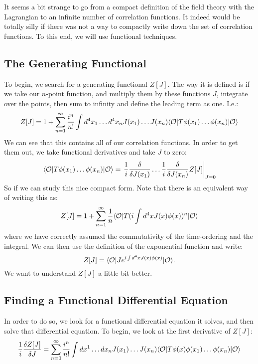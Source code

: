It seems a bit strange to go from a compact definition of the field theory with the Lagrangian to an infinite number of correlation functions. It indeed would be totally silly if there was not a way to compactly write down the set of correlation functions. To this end, we will use functional techniques.

\subsection{The Generating Functional}
To begin, we search for a generating functional $Z[J]$. The way it is defined is if we take our $n$-point function, and multiply them by these functions $J$, integrate over the points, then sum to infinity and define the leading term as one. I.e.:
\begin{equation}
    Z[J] = 1 + \sum_{n=1}^\infty \frac{i^n}{n!}\int d^4x_1 \ldots d^4x_n J(x_1)\ldots J(x_n)\bra{\O}T\phi(x_1) \ldots \phi(x_n)\ket{\O}
\end{equation}
We can see that this contains all of our correlation functions. In order to get them out, we take functional derivatives and take $J$ to zero:
\begin{equation}
    \bra{\O}T\phi(x_1) \ldots \phi(x_n)\ket{\O} = \left.\frac{1}{i}\frac{\delta}{\delta J(x_1)} \ldots \frac{1}{i}\frac{\delta}{\delta J(x_n)}Z[J]\right|_{J=0}
\end{equation}
So if we can study this nice compact form. Note that there is an equivalent way of writing this as:
\begin{equation}
    Z[J] = 1 + \sum_{n=1}^\infty \frac{1}{n}\bra{\O}T(i\int d^4x J(x)\phi(x))^n \ket{\O}
\end{equation}
where we have correctly assumed the commutativity of the time-ordering and the integral. We can then use the definition of the exponential function and write:
\begin{equation}
    Z[J] = \bra{\O}Je^{i\int d^4x J(x)\phi(x)}\ket{\O}.
\end{equation}
We want to understand $Z[J]$ a little bit better.

\subsection{Finding a Functional Differential Equation}
In order to do so, we look for a functional differential equation it solves, and then solve that differential equation. To begin, we look at the first derivative of $Z[J]$:
\begin{equation}
    \frac{1}{i}\frac{\delta Z[J]}{\delta J} = \sum_{n=0}^\infty \frac{i^n}{n!}\int dx^1 \ldots dx_n J(x_1) \ldots J(x_n) \bra{\O}T\phi(x)\phi(x_1) \ldots \phi(x_n)\ket{\O}
\end{equation}

